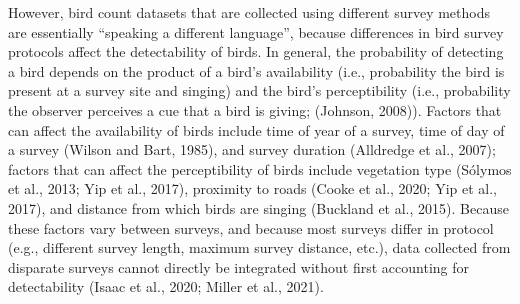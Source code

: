 \documentclass[12pt]{article}
\begin{document}
However, bird count datasets that are collected using different survey methods are essentially “speaking a different language”, because differences in bird survey protocols affect the detectability of birds. In general, the probability of detecting a bird depends on the product of a bird’s availability (i.e., probability the bird is present at a survey site and singing) and the bird’s perceptibility (i.e., probability the observer perceives a cue that a bird is giving; (Johnson, 2008)). Factors that can affect the availability of birds include time of year of a survey, time of day of a survey (Wilson and Bart, 1985), and survey duration (Alldredge et al., 2007); factors that can affect the perceptibility of birds include vegetation type (Sólymos et al., 2013; Yip et al., 2017), proximity to roads (Cooke et al., 2020; Yip et al., 2017), and distance from which birds are singing (Buckland et al., 2015). Because these factors vary between surveys, and because most surveys differ in protocol (e.g., different survey length, maximum survey distance, etc.), data collected from disparate surveys cannot directly be integrated without first accounting for detectability (Isaac et al., 2020; Miller et al., 2021). 

\end{document}
